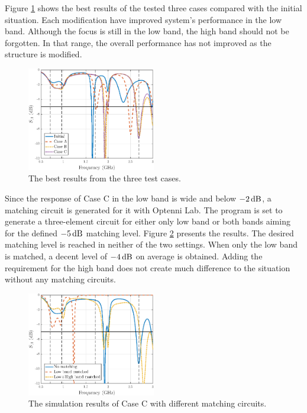 Figure \ref{fig:concept2} shows the best results of the tested three cases compared with the initial situation. Each modification have improved system's performance in the low band. Although the focus is still in the low band, the high band should not be forgotten. In that range, the overall performance has not improved as the structure is modified. 
\begin{figure}[H]
    \vspace{-5pt}
    \centering
    \includegraphics[width=0.5\textwidth]{img/concept2.eps}
    \caption{The best results from the three test cases.}
    \label{fig:concept2}
\end{figure}

Since the response of Case C in the low band is wide and below $-2\,\mathrm{dB}$, a matching circuit is generated for it with Optenni Lab. The program is set to generate a three-element circuit for either only low band or both bands aiming for the defined $-5\,\mathrm{dB}$ matching level. Figure \ref{fig:concept2_match} presents the results. The desired matching level is reached in neither of the two settings. When only the low band is matched, a decent level of $-4\,\mathrm{dB}$ on average is obtained. Adding the requirement for the high band does not create much difference to the situation without any matching circuits. 
\begin{figure}[H]
    \centering
    \includegraphics[width=0.5\textwidth]{img/concept2_match.eps}
    \vspace{-5pt}
    \caption{The simulation results of Case C with different matching circuits.}
    \label{fig:concept2_match}
    \vspace{-12pt}
\end{figure}

